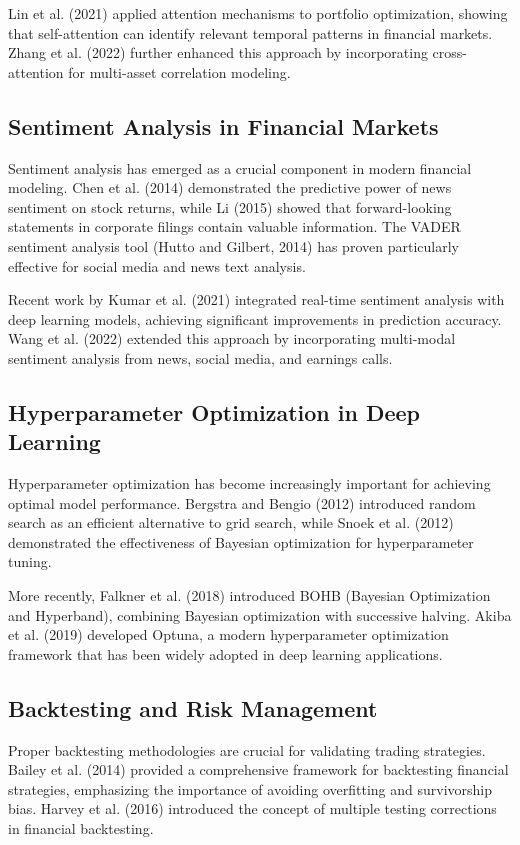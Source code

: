 \documentclass[12pt,a4paper]{article}
\begin{document}
Lin et al. (2021) applied attention mechanisms to portfolio optimization, showing that self-attention can identify relevant temporal patterns in financial markets. Zhang et al. (2022) further enhanced this approach by incorporating cross-attention for multi-asset correlation modeling.

\subsection{Sentiment Analysis in Financial Markets}

Sentiment analysis has emerged as a crucial component in modern financial modeling. Chen et al. (2014) demonstrated the predictive power of news sentiment on stock returns, while Li (2015) showed that forward-looking statements in corporate filings contain valuable information. The VADER sentiment analysis tool (Hutto and Gilbert, 2014) has proven particularly effective for social media and news text analysis.

Recent work by Kumar et al. (2021) integrated real-time sentiment analysis with deep learning models, achieving significant improvements in prediction accuracy. Wang et al. (2022) extended this approach by incorporating multi-modal sentiment analysis from news, social media, and earnings calls.

\subsection{Hyperparameter Optimization in Deep Learning}

Hyperparameter optimization has become increasingly important for achieving optimal model performance. Bergstra and Bengio (2012) introduced random search as an efficient alternative to grid search, while Snoek et al. (2012) demonstrated the effectiveness of Bayesian optimization for hyperparameter tuning.

More recently, Falkner et al. (2018) introduced BOHB (Bayesian Optimization and Hyperband), combining Bayesian optimization with successive halving. Akiba et al. (2019) developed Optuna, a modern hyperparameter optimization framework that has been widely adopted in deep learning applications.

\subsection{Backtesting and Risk Management}

Proper backtesting methodologies are crucial for validating trading strategies. Bailey et al. (2014) provided a comprehensive framework for backtesting financial strategies, emphasizing the importance of avoiding overfitting and survivorship bias. Harvey et al. (2016) introduced the concept of multiple testing corrections in financial backtesting.
\end{document}
